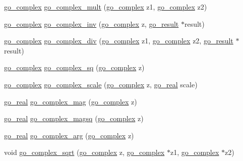 \begin{DoxyCompactItemize}
\item 
\hyperlink{structgomotion_1_1go__complex}{go\-\_\-complex} \hyperlink{namespacegomotion_a874b524e16324e61277ed6d622868c0e}{go\-\_\-complex\-\_\-mult} (\hyperlink{structgomotion_1_1go__complex}{go\-\_\-complex} z1, \hyperlink{structgomotion_1_1go__complex}{go\-\_\-complex} z2)
\item 
\hyperlink{structgomotion_1_1go__complex}{go\-\_\-complex} \hyperlink{namespacegomotion_abd437ae7226e562aeb05bca496b40daf}{go\-\_\-complex\-\_\-inv} (\hyperlink{structgomotion_1_1go__complex}{go\-\_\-complex} z, \hyperlink{gotypes_8h_a55d48b38cd959f63c7e8db8337a9792a}{go\-\_\-result} $\ast$result)
\item 
\hyperlink{structgomotion_1_1go__complex}{go\-\_\-complex} \hyperlink{namespacegomotion_aacd8a8f522f7134163ab18985900e799}{go\-\_\-complex\-\_\-div} (\hyperlink{structgomotion_1_1go__complex}{go\-\_\-complex} z1, \hyperlink{structgomotion_1_1go__complex}{go\-\_\-complex} z2, \hyperlink{gotypes_8h_a55d48b38cd959f63c7e8db8337a9792a}{go\-\_\-result} $\ast$result)
\item 
\hyperlink{structgomotion_1_1go__complex}{go\-\_\-complex} \hyperlink{namespacegomotion_a1052957c9cdfb254dd12c69297f5eb42}{go\-\_\-complex\-\_\-sq} (\hyperlink{structgomotion_1_1go__complex}{go\-\_\-complex} z)
\item 
\hyperlink{structgomotion_1_1go__complex}{go\-\_\-complex} \hyperlink{namespacegomotion_a39801dd54fa663a05160c44e50931d88}{go\-\_\-complex\-\_\-scale} (\hyperlink{structgomotion_1_1go__complex}{go\-\_\-complex} z, \hyperlink{gotypes_8h_afd666a2393eebd71ee455846ac9def9b}{go\-\_\-real} scale)
\item 
\hyperlink{gotypes_8h_afd666a2393eebd71ee455846ac9def9b}{go\-\_\-real} \hyperlink{namespacegomotion_ad9cb32ab0226fd47d5aa44067896259b}{go\-\_\-complex\-\_\-mag} (\hyperlink{structgomotion_1_1go__complex}{go\-\_\-complex} z)
\item 
\hyperlink{gotypes_8h_afd666a2393eebd71ee455846ac9def9b}{go\-\_\-real} \hyperlink{namespacegomotion_aae2a14a55f37184edfa00e1cf3233a81}{go\-\_\-complex\-\_\-magsq} (\hyperlink{structgomotion_1_1go__complex}{go\-\_\-complex} z)
\item 
\hyperlink{gotypes_8h_afd666a2393eebd71ee455846ac9def9b}{go\-\_\-real} \hyperlink{namespacegomotion_a2087eb4a9b3f9a81574b28466cfff247}{go\-\_\-complex\-\_\-arg} (\hyperlink{structgomotion_1_1go__complex}{go\-\_\-complex} z)
\item 
void \hyperlink{namespacegomotion_a83691499b7c3d7ab3003a73532d89f2c}{go\-\_\-complex\-\_\-sqrt} (\hyperlink{structgomotion_1_1go__complex}{go\-\_\-complex} z, \hyperlink{structgomotion_1_1go__complex}{go\-\_\-complex} $\ast$z1, \hyperlink{structgomotion_1_1go__complex}{go\-\_\-complex} $\ast$z2)

\end{DoxyCompactItemize}
